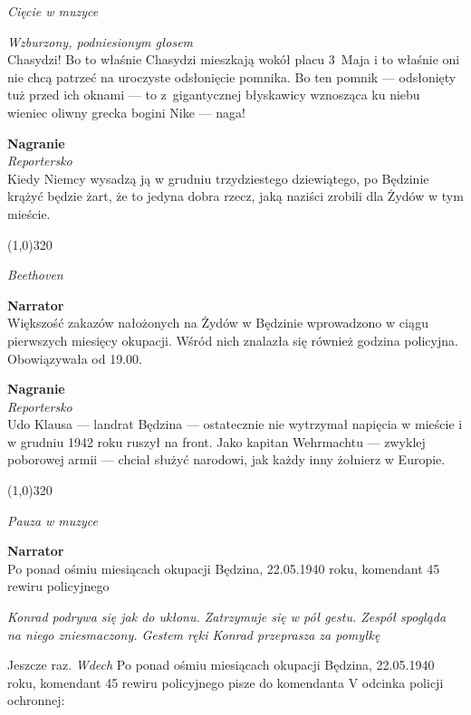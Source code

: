 \documentclass[11pt,a4paper,oneside]{article}
\begin{document}
{\color{light-gray} \emph{Cięcie w muzyce}}

{\color{light-gray} \emph{Wzburzony, podniesionym głosem}}\\
Chasydzi! Bo to właśnie Chasydzi mieszkają wokół placu 3~Maja i to
właśnie oni nie chcą patrzeć na uroczyste odsłonięcie pomnika. Bo ten
pomnik --- odsłonięty tuż przed ich oknami --- to z~gigantycznej błyskawicy
wznosząca ku niebu wieniec oliwny grecka bogini Nike --- naga!

\textbf{Nagranie}\\
{\color{light-gray} \emph{Reportersko}}\\
Kiedy Niemcy wysadzą ją w grudniu trzydziestego dziewiątego, po
Będzinie krążyć będzie żart, że to jedyna dobra rzecz, jaką naziści
zrobili dla Żydów w tym mieście.

\line(1,0){320}

{\color{light-gray} \emph{Beethoven}}

{\color{red}
\textbf{Narrator}\\
Większość zakazów nałożonych na Żydów w Będzinie wprowadzono w ciągu
pierwszych miesięcy okupacji. Wśród nich znalazła się również 
godzina policyjna. Obowiązywała od 19.00.

\textbf{Nagranie}\\
{\color{light-gray} \emph{Reportersko}}\\
Udo Klausa --- landrat Będzina --- ostatecznie nie wytrzymał napięcia
w mieście i w grudniu 1942 roku ruszył na front. Jako
kapitan Wehrmachtu --- zwyklej poborowej armii --- chciał służyć
narodowi, jak każdy inny żołnierz w Europie. 
}

\line(1,0){320}

{\color{light-gray} \emph{Pauza w muzyce}}

\textbf{Narrator}\\
Po ponad ośmiu miesiącach okupacji Będzina, 22.05.1940 roku, komendant
45 rewiru policyjnego

{\color{light-gray} \emph{Konrad podrywa się jak do ukłonu. Zatrzymuje
się w pół gestu. Zespół spogląda na niego zniesmaczony. Gestem ręki
Konrad przeprasza za pomyłkę}}

Jeszcze raz. {\color{light-gray} \emph{Wdech}} Po ponad ośmiu
miesiącach okupacji Będzina, 22.05.1940 roku, komendant 45 rewiru
policyjnego pisze do komendanta V odcinka policji ochronnej:
\end{document}
